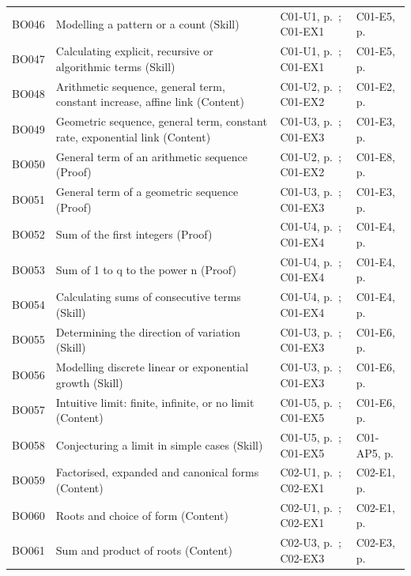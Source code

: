 \begin{longtable}{p{.1\linewidth}p{.43\linewidth}p{.19\linewidth}p{.16\linewidth}}
BO046 & Modelling a pattern or a count (Skill) & C01-U1, p.\,\pageref{C01-U1} ; C01-EX1 & C01-E5, p.\,\pageref{C01-E5} \\
BO047 & Calculating explicit, recursive or algorithmic terms (Skill) & C01-U1, p.\,\pageref{C01-U1} ; C01-EX1 & C01-E5, p.\,\pageref{C01-E5} \\
BO048 & Arithmetic sequence, general term, constant increase, affine link (Content) & C01-U2, p.\,\pageref{C01-U2} ; C01-EX2 & C01-E2, p.\,\pageref{C01-E2} \\
BO049 & Geometric sequence, general term, constant rate, exponential link (Content) & C01-U3, p.\,\pageref{C01-U3} ; C01-EX3 & C01-E3, p.\,\pageref{C01-E3} \\
BO050 & General term of an arithmetic sequence (Proof) & C01-U2, p.\,\pageref{C01-U2} ; C01-EX2 & C01-E8, p.\,\pageref{C01-E8} \\
BO051 & General term of a geometric sequence (Proof) & C01-U3, p.\,\pageref{C01-U3} ; C01-EX3 & C01-E3, p.\,\pageref{C01-E3} \\
BO052 & Sum of the first integers (Proof) & C01-U4, p.\,\pageref{C01-U4} ; C01-EX4 & C01-E4, p.\,\pageref{C01-E4} \\
BO053 & Sum of 1 to q to the power n (Proof) & C01-U4, p.\,\pageref{C01-U4} ; C01-EX4 & C01-E4, p.\,\pageref{C01-E4} \\
BO054 & Calculating sums of consecutive terms (Skill) & C01-U4, p.\,\pageref{C01-U4} ; C01-EX4 & C01-E4, p.\,\pageref{C01-E4} \\
BO055 & Determining the direction of variation (Skill) & C01-U3, p.\,\pageref{C01-U3} ; C01-EX3 & C01-E6, p.\,\pageref{C01-E6} \\
BO056 & Modelling discrete linear or exponential growth (Skill) & C01-U3, p.\,\pageref{C01-U3} ; C01-EX3 & C01-E6, p.\,\pageref{C01-E6} \\
BO057 & Intuitive limit: finite, infinite, or no limit (Content) & C01-U5, p.\,\pageref{C01-U5} ; C01-EX5 & C01-E6, p.\,\pageref{C01-E6} \\
BO058 & Conjecturing a limit in simple cases (Skill) & C01-U5, p.\,\pageref{C01-U5} ; C01-EX5 & C01-AP5, p.\,\pageref{C01-AP5} \\
BO059 & Factorised, expanded and canonical forms (Content) & C02-U1, p.\,\pageref{C02-U1} ; C02-EX1 & C02-E1, p.\,\pageref{C02-E1} \\
BO060 & Roots and choice of form (Content) & C02-U1, p.\,\pageref{C02-U1} ; C02-EX1 & C02-E1, p.\,\pageref{C02-E1} \\
BO061 & Sum and product of roots (Content) & C02-U3, p.\,\pageref{C02-U3} ; C02-EX3 & C02-E3, p.\,\pageref{C02-E3} \\

\end{longtable}
